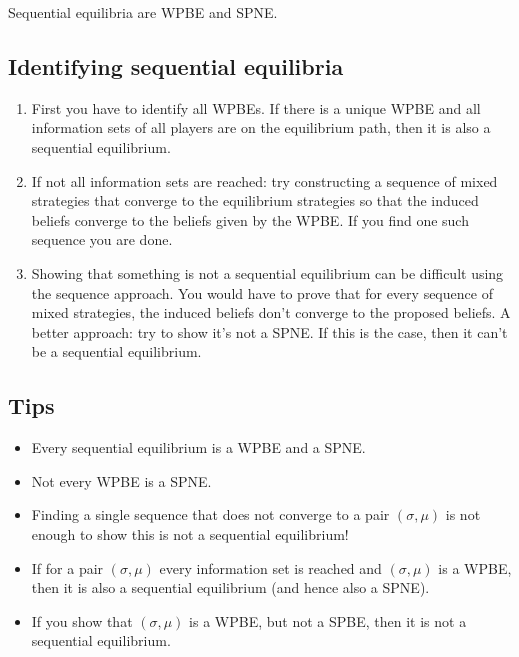 \documentclass[letter, 11pt]{article}
\theoremstyle{basic}
\begin{document}
\begin{spacing}{1.0}
Sequential equilibria are WPBE and SPNE.

\subsection{Identifying sequential equilibria}

\begin{enumerate}
\item First you have to identify all WPBEs. If there is a unique WPBE and
  all information sets of all players are on the equilibrium path, then it
  is also a sequential equilibrium.
\item If not all information sets are reached: try constructing a sequence
  of mixed strategies that converge to the equilibrium strategies so that
  the induced beliefs converge to the beliefs given by the WPBE. If you
  find one such sequence you are done.
\item Showing that something is not a sequential equilibrium can be
  difficult using the sequence approach. You would have to prove that for
  every sequence of mixed strategies, the induced beliefs don't converge to
  the proposed beliefs. A better approach: try to show it's not a
  SPNE. If this is the case, then it can't be a sequential equilibrium.
\end{enumerate}

\subsection{Tips}

\begin{itemize}
\item Every sequential equilibrium is a WPBE and a SPNE.
\item Not every WPBE is a SPNE.
\item Finding a single sequence that does not converge to a pair $(\sigma,
  \mu)$ is not enough to show this is not a sequential equilibrium!
\item If for a pair $(\sigma, \mu)$ every information set is reached and
  $(\sigma, \mu)$ is a WPBE, then it is also a sequential equilibrium (and
  hence also a SPNE).
\item If you show that $(\sigma, \mu)$ is a WPBE, but not a SPBE, then it
  is not a sequential equilibrium.
\end{itemize}

\end{spacing}
\end{document}
